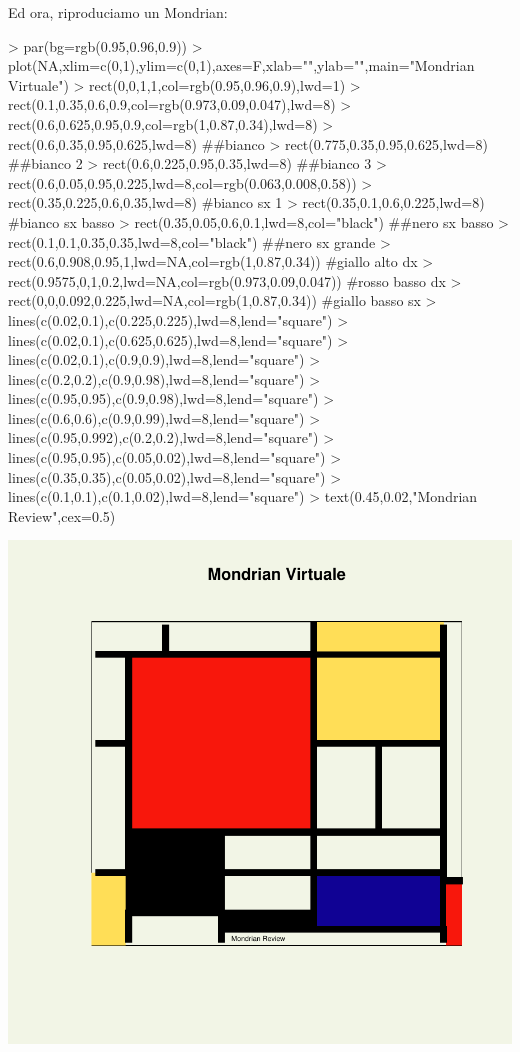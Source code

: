 \documentclass[onecolumn,11pt]{book}
\begin{document}
Ed ora, riproduciamo un Mondrian:
\begin{Schunk}
\begin{Sinput}
> par(bg=rgb(0.95,0.96,0.9))
> plot(NA,xlim=c(0,1),ylim=c(0,1),axes=F,xlab="",ylab="",main="Mondrian Virtuale")
> rect(0,0,1,1,col=rgb(0.95,0.96,0.9),lwd=1)
> rect(0.1,0.35,0.6,0.9,col=rgb(0.973,0.09,0.047),lwd=8) 
> rect(0.6,0.625,0.95,0.9,col=rgb(1,0.87,0.34),lwd=8)  
> rect(0.6,0.35,0.95,0.625,lwd=8) ##bianco
> rect(0.775,0.35,0.95,0.625,lwd=8) ##bianco 2
> rect(0.6,0.225,0.95,0.35,lwd=8) ##bianco 3
> rect(0.6,0.05,0.95,0.225,lwd=8,col=rgb(0.063,0.008,0.58))  
> rect(0.35,0.225,0.6,0.35,lwd=8) #bianco sx 1
> rect(0.35,0.1,0.6,0.225,lwd=8) #bianco sx basso
> rect(0.35,0.05,0.6,0.1,lwd=8,col="black") ##nero sx basso
> rect(0.1,0.1,0.35,0.35,lwd=8,col="black") ##nero sx grande
> rect(0.6,0.908,0.95,1,lwd=NA,col=rgb(1,0.87,0.34)) #giallo alto dx
> rect(0.9575,0,1,0.2,lwd=NA,col=rgb(0.973,0.09,0.047)) #rosso basso dx
> rect(0,0,0.092,0.225,lwd=NA,col=rgb(1,0.87,0.34)) #giallo basso sx
> lines(c(0.02,0.1),c(0.225,0.225),lwd=8,lend="square")
> lines(c(0.02,0.1),c(0.625,0.625),lwd=8,lend="square")
> lines(c(0.02,0.1),c(0.9,0.9),lwd=8,lend="square")
> lines(c(0.2,0.2),c(0.9,0.98),lwd=8,lend="square")
> lines(c(0.95,0.95),c(0.9,0.98),lwd=8,lend="square")
> lines(c(0.6,0.6),c(0.9,0.99),lwd=8,lend="square")
> lines(c(0.95,0.992),c(0.2,0.2),lwd=8,lend="square")
> lines(c(0.95,0.95),c(0.05,0.02),lwd=8,lend="square")
> lines(c(0.35,0.35),c(0.05,0.02),lwd=8,lend="square")
> lines(c(0.1,0.1),c(0.1,0.02),lwd=8,lend="square")
> text(0.45,0.02,"Mondrian Review",cex=0.5)
\end{Sinput}
\end{Schunk}
\includegraphics{statisticaconR-394}
\end{document}
